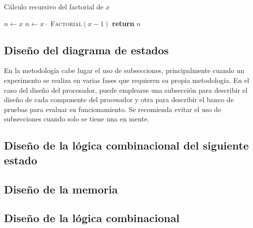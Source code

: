\documentclass[12pt]{article}
\begin{document}
\begin{center}
    \begin{minipage}[t]{0.5\textwidth}
        \begin{algorithm}[H]
            \caption{Cálculo recursivo del factorial de $x$}\label{alg:factorial}
            \begin{algorithmic}[1]
                    \State $n \gets x$
                \Else
                    \State $n \gets x \cdot $ \textsc{Factorial}$(x-1)$
                \EndIf
                \State \textbf{return} $n$
                \EndProcedure
            \end{algorithmic}
        \end{algorithm}
    \end{minipage}
\end{center}



\subsection{Diseño del diagrama de estados}
En la metodología cabe lugar el uso de subsecciones, principalmente cuando un 
experimento se realiza en varias fases que requieren su propia metodología. En 
el caso del diseño del procesador, puede emplearse una subsección para 
describir el diseño de cada componente del procesador y otra para describir el 
banco de pruebas para evaluar su funcionamiento. Se recomienda evitar el uso 
de subsecciones cuando solo se tiene una en mente.

\subsection{Diseño de la lógica combinacional del siguiente estado}

\subsection{Diseño de la memoria}

\subsection{Diseño de la lógica combinacional}
\end{document}
